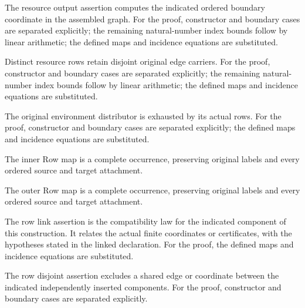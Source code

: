 The resource output assertion computes the indicated ordered boundary coordinate in the assembled graph.
For the proof, constructor and boundary cases are separated explicitly; the remaining natural-number index bounds follow by linear arithmetic; the defined maps and incidence equations are substituted.
\par{}

Distinct resource rows retain disjoint original edge carriers.
For the proof, constructor and boundary cases are separated explicitly; the remaining natural-number index bounds follow by linear arithmetic; the defined maps and incidence equations are substituted.
\par{}

The original environment distributor is exhausted by its actual rows.
For the proof, constructor and boundary cases are separated explicitly; the defined maps and incidence equations are substituted.
\par{}

The inner Row map is a complete occurrence, preserving original labels and every ordered source and target attachment.
\par{}

The outer Row map is a complete occurrence, preserving original labels and every ordered source and target attachment.
\par{}

The row link assertion is the compatibility law for the indicated component of this construction. It relates the actual finite coordinates or certificates, with the hypotheses stated in the linked declaration.
For the proof, the defined maps and incidence equations are substituted.
\par{}

The row disjoint assertion excludes a shared edge or coordinate between the indicated independently inserted components.
For the proof, constructor and boundary cases are separated explicitly.
\par{}

